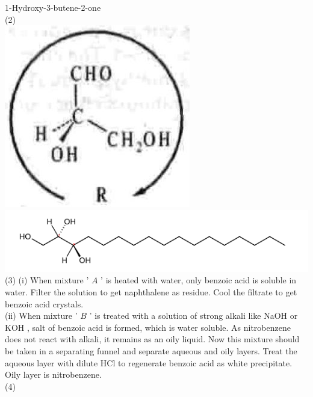 \documentclass[10pt]{article}
\begin{document}
1-Hydroxy-3-butene-2-one\\
(2)\\
\includegraphics[max width=\textwidth, center]{2025_01_28_8470952b98110cec3aabg-167(3)}\\
\includegraphics{smile-28af9c1dd4cd8e01a7b4f3c154f31f60d8e93189}\\
(3) (i) When mixture ' $A$ ' is heated with water, only benzoic acid is soluble in water. Filter the solution to get naphthalene as residue. Cool the filtrate to get benzoic acid crystals.\\
(ii) When mixture ' $B$ ' is treated with a solution of strong alkali like NaOH or KOH , salt of benzoic acid is formed, which is water soluble. As nitrobenzene does not react with alkali, it remains as an oily liquid. Now this mixture should be taken in a separating funnel and separate aqueous and oily layers. Treat the aqueous layer with dilute HCl to regenerate benzoic acid as white precipitate. Oily layer is nitrobenzene.\\
(4)\\
\end{document}
